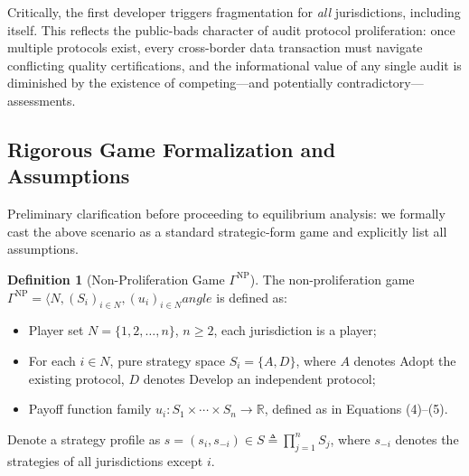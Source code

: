\documentclass[12pt,a4paper]{article}
\theoremstyle{definition}
\newtheorem{definition}{Definition}[section]
\theoremstyle{remark}
\begin{document}
Critically, the first developer triggers fragmentation for \textit{all} jurisdictions, including itself. This reflects the public-bads character of audit protocol proliferation: once multiple protocols exist, every cross-border data transaction must navigate conflicting quality certifications, and the informational value of any single audit is diminished by the existence of competing—and potentially contradictory—assessments.

\subsection{Rigorous Game Formalization and Assumptions}

Preliminary clarification before proceeding to equilibrium analysis: we formally cast the above scenario as a standard strategic-form game and explicitly list all assumptions.

\begin{definition}[Non-Proliferation Game $\Gamma^{\text{NP}}$]
The non-proliferation game $\Gamma^{\text{NP}} = \langle N, (S_i)_{i \in N}, (u_i)_{i \in N} 
angle$ is defined as:
\begin{itemize}
\item Player set $N = \{1, 2, \ldots, n\}$, $n \geq 2$, each jurisdiction is a player;
\item For each $i \in N$, pure strategy space $S_i = \{A, D\}$, where $A$ denotes Adopt the existing protocol, $D$ denotes Develop an independent protocol;
\item Payoff function family $u_i: S_1 \times \cdots \times S_n \to \mathbb{R}$, defined as in Equations (4)--(5).
\end{itemize}
Denote a strategy profile as $s = (s_i, s_{-i}) \in S \triangleq \prod_{j=1}^n S_j$, where $s_{-i}$ denotes the strategies of all jurisdictions except $i$.
\end{definition}
\end{document}
